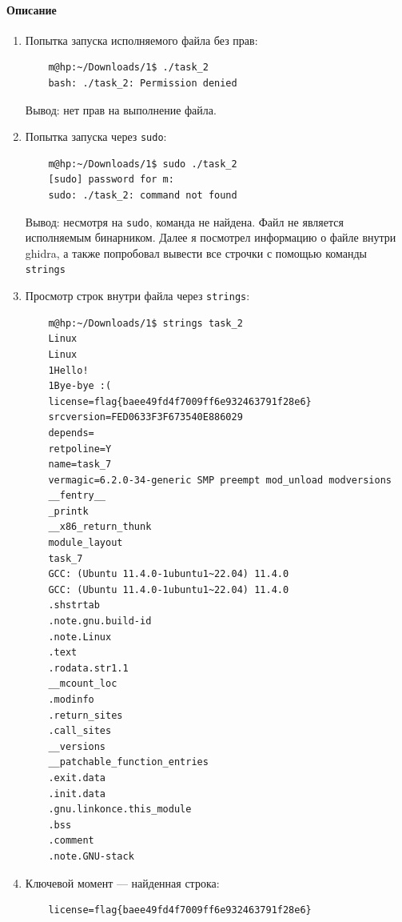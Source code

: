     \paragraph{Описание}
    \begin{enumerate}
        \item Попытка запуска исполняемого файла без прав:
        \begin{verbatim}
    m@hp:~/Downloads/1$ ./task_2
    bash: ./task_2: Permission denied
        \end{verbatim}
        Вывод: нет прав на выполнение файла.

        \item Попытка запуска через \texttt{sudo}:
        \begin{verbatim}
    m@hp:~/Downloads/1$ sudo ./task_2
    [sudo] password for m:
    sudo: ./task_2: command not found
        \end{verbatim}
        Вывод: несмотря на \texttt{sudo}, команда не найдена. Файл не является исполняемым бинарником. Далее я посмотрел информацию о файле внутри ghidra, а также попробовал вывести все строчки с помощью команды \texttt{strings}
        \item Просмотр строк внутри файла через \texttt{strings}:
        \begin{verbatim}
    m@hp:~/Downloads/1$ strings task_2
    Linux
    Linux
    1Hello!
    1Bye-bye :(
    license=flag{baee49fd4f7009ff6e932463791f28e6}
    srcversion=FED0633F3F673540E886029
    depends=
    retpoline=Y
    name=task_7
    vermagic=6.2.0-34-generic SMP preempt mod_unload modversions
    __fentry__
    _printk
    __x86_return_thunk
    module_layout
    task_7
    GCC: (Ubuntu 11.4.0-1ubuntu1~22.04) 11.4.0
    GCC: (Ubuntu 11.4.0-1ubuntu1~22.04) 11.4.0
    .shstrtab
    .note.gnu.build-id
    .note.Linux
    .text
    .rodata.str1.1
    __mcount_loc
    .modinfo
    .return_sites
    .call_sites
    __versions
    __patchable_function_entries
    .exit.data
    .init.data
    .gnu.linkonce.this_module
    .bss
    .comment
    .note.GNU-stack
        \end{verbatim}

        \item Ключевой момент — найденная строка:
        \begin{verbatim}
    license=flag{baee49fd4f7009ff6e932463791f28e6}
        \end{verbatim}
    \end{enumerate}

    \vspace{0.5cm}

